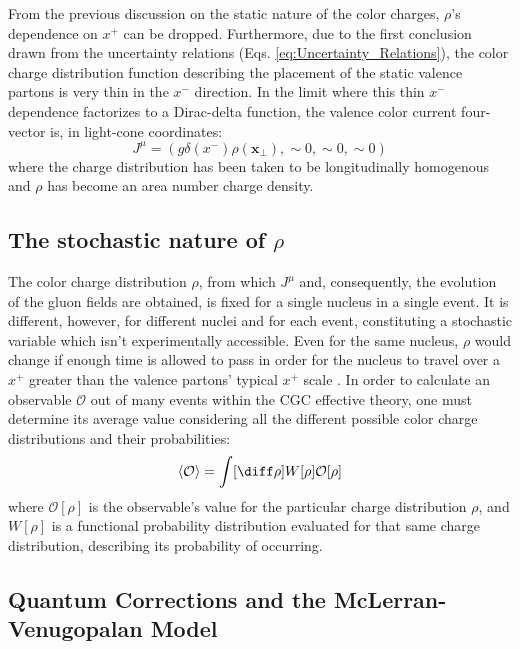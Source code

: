 From the previous discussion on the static nature of the color charges, $\rho$'s dependence on $x^+$ can be dropped. Furthermore, due to the first conclusion drawn from the uncertainty relations (Eqs. \ref{eq:Uncertainty_Relations}), the color charge distribution function describing the placement of the static valence partons is very thin in the $x^-$ direction. In the limit where this thin $x^-$ dependence factorizes to a Dirac-delta function, the valence color current four-vector is, in light-cone coordinates:
\begin{equation}
	{J}^\mu = (g \delta (x^-) \rho (\mathbf{x}_\perp), \sim 0, \sim 0, \sim 0)
	\label{eq:+_Current}
\end{equation}
where the charge distribution has been taken to be longitudinally homogenous and $\rho$ has become an area number charge density. 

\subsection{The stochastic nature of $\rho$}
The color charge distribution $\rho$, from which $J^\mu$ and, consequently, the evolution of the gluon fields are obtained, is fixed for a single nucleus in a single event. It is different, however, for different nuclei and for each event, constituting a stochastic variable \cite{Gelis_2010} which isn't experimentally accessible.  Even for the same nucleus, $\rho$ would change if enough time is allowed to pass in order for the nucleus to travel over a $x^+$ greater than the valence partons' typical $x^+$ scale \cite{Gelis_Habilitation}. In order to calculate an observable $\mathcal{O}$ out of many events within the \gls{CGC} effective theory, one must determine its average value considering all the different possible color charge distributions and their probabilities: \cite{Gelis_2010}
\begin{equation}
	\left< \mathcal{O} \right> = \int [\diff \rho] W[\rho] \mathcal{O}[\rho]
\end{equation}
where $\mathcal{O}[\rho]$ is the observable's value for the particular charge distribution $\rho$, and $W[\rho]$ is a functional probability distribution evaluated for that same charge distribution, describing its probability of occurring.

\subsection{Quantum Corrections and the McLerran-Venugopalan Model}

